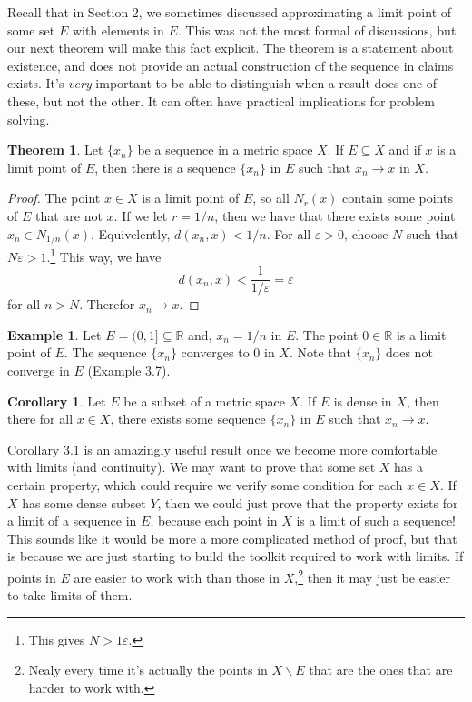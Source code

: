 \documentclass{article}
\newcommand{\R}{\mathbb{R}}
\theoremstyle{definition}
\newtheorem{theorem}{Theorem}[section]
\newtheorem{corollary}{Corollary}[section]
\newtheorem{example}{Example}[section]
\begin{document}
	Recall that in Section 2, we sometimes discussed approximating a limit point of some set $ E $ with elements in $ E $. This was not the most formal of discussions, but our next theorem will make this fact explicit. The theorem is a statement about existence, and does not provide an actual construction of the sequence in claims exists. It's \textit{very} important to be able to distinguish when a result does one of these, but not the other. It can often have practical implications for problem solving. 
	\begin{theorem}
		Let $ \{x_n\} $ be a sequence in a metric space $ X $. If $ E\subseteq X $ and if $ x $ is a limit point of $ E $, then there is a sequence $ \{x_n\} $ in $ E $ such that $ x_n\to x $ in $ X $. 
	\end{theorem}
	\begin{proof}
		The point $ x\in X $ is a limit point of $ E $, so all $ N_r(x) $ contain some points of $ E $ that are not $ x $. If we let $ r=1/n $, then we have that there exists some point $ x_n\in N_{1/n}(x) $. Equivelently, $ d(x_n,x)<1/n $. For all $ \varepsilon>0 $, choose $ N $ such that $ N\varepsilon >1 $.\footnote{This gives $ N>1\varepsilon $.} This way, we have $$ d(x_n,x)<\frac{1}{1/\varepsilon}=\varepsilon $$ for all $ n>N $. Therefor $x_n\to x$.
	\end{proof}
	\begin{example}
		Let $ E=(0,1]\subseteq\R $ and, $ x_n=1/n $ in $ E $. The point $ 0\in\R $ is a limit point of $ E $. The sequence $ \{x_n\} $ converges to $ 0 $ in $ X $. Note that $ \{x_n\} $ does not converge in $ E $ (Example 3.7).   
	\end{example}
	\begin{corollary}
		Let $ E $ be a subset of a metric space $ X $. If $ E $ is dense in $ X $, then there for all $ x\in X $, there exists some sequence $ \{x_n\} $ in $ E $ such that $ x_n\to x $. 
	\end{corollary}
	Corollary 3.1 is an amazingly useful result once we become more comfortable with limits (and continuity). We may want to prove that some set $ X $ has a certain property, which could require we verify some condition for each $ x\in X $. If $ X $ has some dense subset $ Y $, then we could just prove that the property exists for a limit of a sequence in $ E $, because each point in $ X $ is a limit of such a sequence! This sounds like it would be more a more complicated method of proof, but that is because we are just starting to build the toolkit required to work with limits. If points in $ E $ are easier to work with than those in $ X $,\footnote{Nealy every time it's actually the points in $ X\backslash E $ that are the ones that are harder to work with.} then it may just be easier to take limits of them. 
\end{document}
